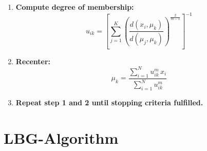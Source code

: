 \begin{enumerate}
\item \textbf{Compute degree of membership:}
	$$u_{ik} = \left[ \sum_{j=1}^K \left( \frac{d(x_i, \mu_k)}{d(\mu_j, \mu_k)} \right)^{\frac{2}{m-1}} \right]^{-1}$$
\item \textbf{Recenter:}
	$$\mu_k = \frac{\sum_{i=1}^N u_{ik}^m \, x_i}{\sum_{i=1}^N u_{ik}^m}$$
\item \textbf{Repeat step 1 and 2 until stopping criteria fulfilled.}
\end{enumerate}

\section{LBG-Algorithm}
